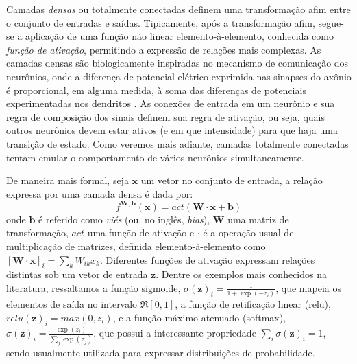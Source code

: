 Camadas \textit{densas} ou totalmente conectadas definem uma transformação afim entre o conjunto de entradas e saídas. Tipicamente, após a transformação afim, segue-se a aplicação de uma função não linear elemento-à-elemento, conhecida como \textit{função de ativação}, permitindo a expressão de relações mais complexas. As camadas densas são biologicamente inspiradas no mecanismo de comunicação dos neurônios, onde a diferença de potencial elétrico exprimida nas sinapses do axônio é proporcional, em alguma medida, à soma das diferenças de potenciais experimentadas nos dendritos \cite{GerstnerNeuronalDynamics}. As conexões de entrada em um neurônio e sua regra de composição dos sinais definem sua regra de ativação, ou seja, quais outros neurônios devem estar ativos (e em que intensidade) para que haja uma transição de estado. Como veremos mais adiante, camadas totalmente conectadas tentam emular o comportamento de vários neurônios simultaneamente.

De maneira mais formal, seja $\mathbf{x}$ um vetor no conjunto de entrada, a relação expressa por uma camada densa é dada por:
\begin{equation}\label{denseop}
f^{\mathbf{W},\mathbf{b}}(\mathbf{x}) = act(\mathbf{W} \cdot \mathbf{x} + \mathbf{b})
\end{equation}
onde $\mathbf{b}$ é referido como \textit{viés} (ou, no inglês, \textit{bias}), $\mathbf{W}$ uma matriz de transformação, $act$ uma função de ativação e $\cdot$ é a operação usual de multiplicação de matrizes, definida elemento-à-elemento como $[\mathbf{W} \cdot \mathbf{x}]_{i} = \sum_k W_{ik} x_k$. Diferentes funções de ativação expressam relações distintas sob um vetor de entrada $\mathbf{z}$. Dentre os exemplos mais conhecidos na literatura, ressaltamos a função sigmoide, $\sigma(\mathbf{z})_i = \frac{1}{1+\exp(-z_i)}$, que mapeia os elementos de saída no intervalo $\Re[0,1]$, a função de retificação linear (relu), $relu(\mathbf{z})_i = max(0, z_i)$, e a função máximo atenuado (softmax), $\sigma(\mathbf{z})_i = \frac{\exp(z_i)}{\sum_j \exp(z_j)}$, que possui a interessante propriedade $\sum_i \sigma(\mathbf{z})_i = 1$, sendo usualmente utilizada para expressar distribuições de probabilidade.

